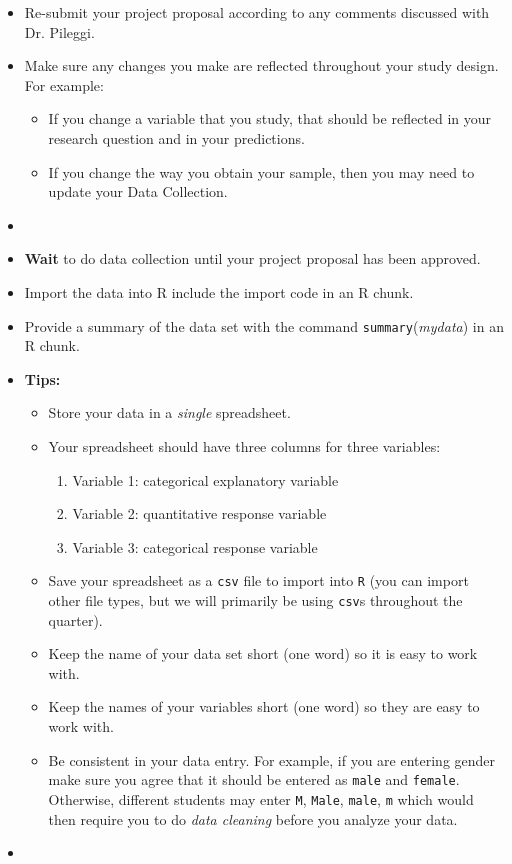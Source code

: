 \documentclass[letterpaper,12pt]{report}
\begin{document}
\begin{itemize}
\item Re-submit your project proposal according to any comments discussed with Dr. Pileggi.
\item Make sure any changes you make are reflected throughout your study design.  For example:
\begin{itemize}
\item If you change a variable that you study, that should be reflected in your research question and in your predictions.
\item If you change the way you obtain your sample, then you may need to update your Data Collection.
\end{itemize}
\item[]
\end{itemize}


{}
\begin{itemize}
    \item \textbf{Wait} to do data collection until your project proposal has been approved.
    \item Import the data into R include the import code in an R chunk.
    \item Provide a summary of the data set with the command \texttt{summary}(\emph{mydata}) in an R chunk.
    \item \textbf{Tips:}
    \begin{itemize}
    \item Store your data in a \emph{single} spreadsheet.
    \item Your spreadsheet should have three columns for three variables:
    \begin{enumerate}
    \item[] Variable 1: categorical explanatory variable
    \item[] Variable 2: quantitative response variable
    \item[] Variable 3: categorical response variable
    \end{enumerate}
    \item Save your spreadsheet as a \texttt{csv} file to import into \texttt{R} (you can import other file types, but we will primarily be using \texttt{csv}s throughout the quarter).
    \item Keep the name of your data set short (one word) so it is easy to work with.
    \item Keep the names of your variables short (one word) so they are easy to work with.
    \item Be consistent in your data entry.  For example, if you are entering gender make sure you agree that it should be entered as \texttt{male} and \texttt{female}.  Otherwise, different students may enter \texttt{M}, \texttt{Male}, \texttt{male}, \texttt{m} which would then require you to do \emph{data cleaning} before you analyze your data.
    \end{itemize}
    \item[]
\end{itemize}
\end{document}
